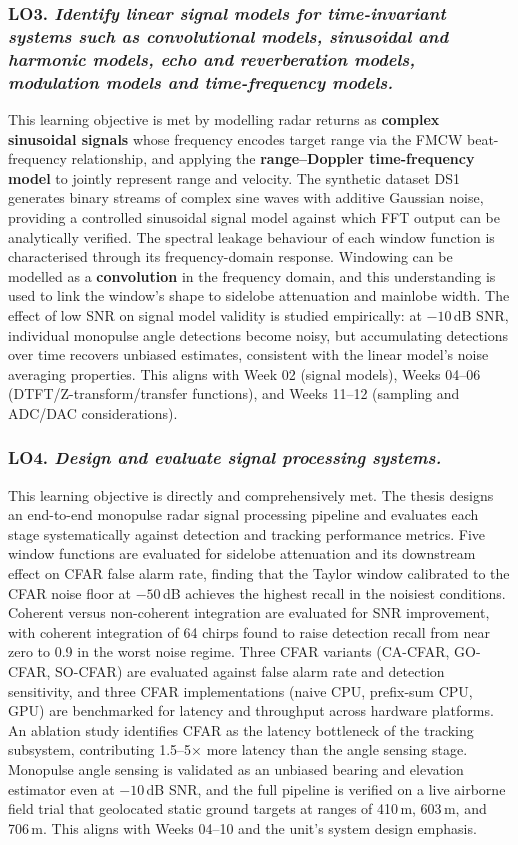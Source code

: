 \subsubsection*{LO3. \emph{Identify linear signal models for time-invariant systems such
as convolutional models, sinusoidal and harmonic models, echo and reverberation models,
modulation models and time-frequency models.}}
This learning objective is met by modelling radar returns as \textbf{complex sinusoidal
signals} whose frequency encodes target range via the FMCW beat-frequency relationship,
and applying the \textbf{range--Doppler time-frequency model} to jointly represent range
and velocity. The synthetic dataset DS1 generates binary streams of complex sine waves
with additive Gaussian noise, providing a controlled sinusoidal signal model against
which FFT output can be analytically verified. The spectral leakage behaviour of each
window function is characterised through its frequency-domain response. Windowing
can be modelled as a \textbf{convolution} in the frequency domain, and this understanding
is used to link the window's shape to sidelobe attenuation and mainlobe width.  
The effect of low SNR on signal model validity is studied
empirically: at $-10$\,dB SNR, individual monopulse angle detections become noisy, but
accumulating detections over time recovers unbiased estimates, consistent with the
linear model's noise averaging properties. This aligns with Week 02 (signal models),
Weeks 04--06 (DTFT/Z-transform/transfer functions), and Weeks 11--12 (sampling and
ADC/DAC considerations).

\subsubsection*{LO4. \emph{Design and evaluate signal processing systems.}}
This learning objective is directly and comprehensively met. The thesis designs an
end-to-end monopulse radar signal processing pipeline and evaluates each stage
systematically against detection and tracking performance metrics. Five window functions
are evaluated for sidelobe attenuation and its downstream effect on CFAR false alarm
rate, finding that the Taylor window calibrated to the CFAR noise floor at $-50$\,dB
achieves the highest recall in the noisiest conditions. Coherent versus non-coherent
integration are evaluated for SNR improvement, with coherent integration of 64 chirps
found to raise detection recall from near zero to 0.9 in the worst noise regime. Three
CFAR variants (CA-CFAR, GO-CFAR, SO-CFAR) are evaluated against false alarm rate and
detection sensitivity, and three CFAR implementations (naive CPU, prefix-sum CPU, GPU)
are benchmarked for latency and throughput across hardware platforms. An ablation study
identifies CFAR as the latency bottleneck of the tracking subsystem, contributing
1.5--5$\times$ more latency than the angle sensing stage. Monopulse angle sensing is
validated as an unbiased bearing and elevation estimator even at $-10$\,dB SNR, and the
full pipeline is verified on a live airborne field trial that geolocated static ground
targets at ranges of 410\,m, 603\,m, and 706\,m. This aligns with Weeks 04--10 and the
unit's system design emphasis.

